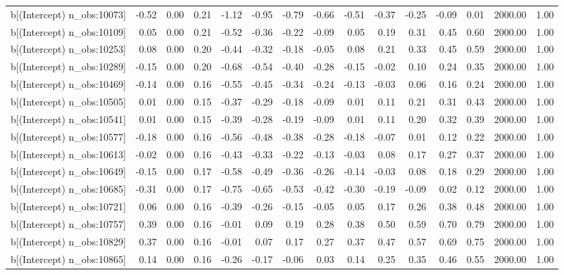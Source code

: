 \begin{table}[ht]
\begin{tabular}{rrrrrrrrrrrrrrr}
  b[(Intercept) n\_obs:10073] & -0.52 & 0.00 & 0.21 & -1.12 & -0.95 & -0.79 & -0.66 & -0.51 & -0.37 & -0.25 & -0.09 & 0.01 & 2000.00 & 1.00 \\ 
  b[(Intercept) n\_obs:10109] & 0.05 & 0.00 & 0.21 & -0.52 & -0.36 & -0.22 & -0.09 & 0.05 & 0.19 & 0.31 & 0.45 & 0.60 & 2000.00 & 1.00 \\ 
  b[(Intercept) n\_obs:10253] & 0.08 & 0.00 & 0.20 & -0.44 & -0.32 & -0.18 & -0.05 & 0.08 & 0.21 & 0.33 & 0.45 & 0.59 & 2000.00 & 1.00 \\ 
  b[(Intercept) n\_obs:10289] & -0.15 & 0.00 & 0.20 & -0.68 & -0.54 & -0.40 & -0.28 & -0.15 & -0.02 & 0.10 & 0.24 & 0.35 & 2000.00 & 1.00 \\ 
  b[(Intercept) n\_obs:10469] & -0.14 & 0.00 & 0.16 & -0.55 & -0.45 & -0.34 & -0.24 & -0.13 & -0.03 & 0.06 & 0.16 & 0.24 & 2000.00 & 1.00 \\ 
  b[(Intercept) n\_obs:10505] & 0.01 & 0.00 & 0.15 & -0.37 & -0.29 & -0.18 & -0.09 & 0.01 & 0.11 & 0.21 & 0.31 & 0.43 & 2000.00 & 1.00 \\ 
  b[(Intercept) n\_obs:10541] & 0.01 & 0.00 & 0.15 & -0.39 & -0.28 & -0.19 & -0.09 & 0.01 & 0.11 & 0.20 & 0.32 & 0.39 & 2000.00 & 1.00 \\ 
  b[(Intercept) n\_obs:10577] & -0.18 & 0.00 & 0.16 & -0.56 & -0.48 & -0.38 & -0.28 & -0.18 & -0.07 & 0.01 & 0.12 & 0.22 & 2000.00 & 1.00 \\ 
  b[(Intercept) n\_obs:10613] & -0.02 & 0.00 & 0.16 & -0.43 & -0.33 & -0.22 & -0.13 & -0.03 & 0.08 & 0.17 & 0.27 & 0.37 & 2000.00 & 1.00 \\ 
  b[(Intercept) n\_obs:10649] & -0.15 & 0.00 & 0.17 & -0.58 & -0.49 & -0.36 & -0.26 & -0.14 & -0.03 & 0.08 & 0.18 & 0.29 & 2000.00 & 1.00 \\ 
  b[(Intercept) n\_obs:10685] & -0.31 & 0.00 & 0.17 & -0.75 & -0.65 & -0.53 & -0.42 & -0.30 & -0.19 & -0.09 & 0.02 & 0.12 & 2000.00 & 1.00 \\ 
  b[(Intercept) n\_obs:10721] & 0.06 & 0.00 & 0.16 & -0.39 & -0.26 & -0.15 & -0.05 & 0.05 & 0.17 & 0.26 & 0.38 & 0.48 & 2000.00 & 1.00 \\ 
  b[(Intercept) n\_obs:10757] & 0.39 & 0.00 & 0.16 & -0.01 & 0.09 & 0.19 & 0.28 & 0.38 & 0.50 & 0.59 & 0.70 & 0.79 & 2000.00 & 1.00 \\ 
  b[(Intercept) n\_obs:10829] & 0.37 & 0.00 & 0.16 & -0.01 & 0.07 & 0.17 & 0.27 & 0.37 & 0.47 & 0.57 & 0.69 & 0.75 & 2000.00 & 1.00 \\ 
  b[(Intercept) n\_obs:10865] & 0.14 & 0.00 & 0.16 & -0.26 & -0.17 & -0.06 & 0.03 & 0.14 & 0.25 & 0.35 & 0.46 & 0.55 & 2000.00 & 1.00 \\ 

\end{tabular}
\end{table}
